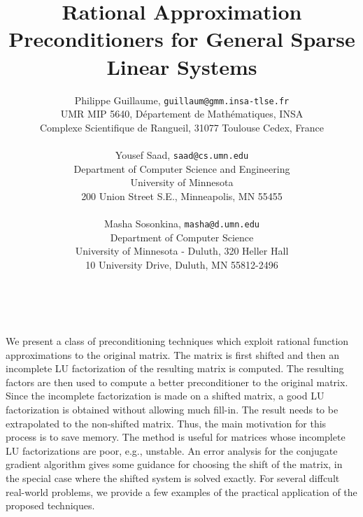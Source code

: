 \documentclass[11pt]{article}
\date{ ~ \hspace{-4mm}}
\title{{\bf  Rational Approximation Preconditioners for General Sparse Linear Systems }  }
\author{Philippe Guillaume, {\tt guillaum@gmm.insa-tlse.fr} \\ UMR MIP 5640, D\'{e}partement de Math\'{e}matiques, INSA \\ Complexe Scientifique de Rangueil, 31077 Toulouse Cedex, France \\ \\ Yousef Saad, {\tt saad@cs.umn.edu} \\ Department of Computer Science and Engineering \\ University of Minnesota \\ 200 Union Street S.E., Minneapolis, MN 55455 \\ \\ Masha Sosonkina, {\tt masha@d.umn.edu} \\ Department of Computer Science \\ University of Minnesota - Duluth, 320 Heller Hall \\ 10 University Drive, Duluth, MN 55812-2496}
\begin{document}
\maketitle
\thispagestyle{empty}





 



We present a class of preconditioning techniques which exploit
rational function approximations to the original matrix. The matrix is
first shifted and then an incomplete LU factorization of the resulting matrix
is computed. The resulting factors are then used to compute a better
preconditioner to the original matrix. Since the incomplete
factorization is made on a shifted matrix, a good LU factorization 
is obtained without
allowing much fill-in. The result needs to be extrapolated to the
non-shifted matrix. Thus, the main motivation for this process is to
save memory. The method is useful for matrices whose incomplete LU
factorizations are poor, e.g., unstable. An error analysis for the 
conjugate gradient
algorithm gives some guidance for choosing the shift of the matrix, in
the special case where the shifted system is solved exactly.
For several diffcult real-world problems, we provide a few examples of the 
practical application of the proposed techniques. 
\end{document}
